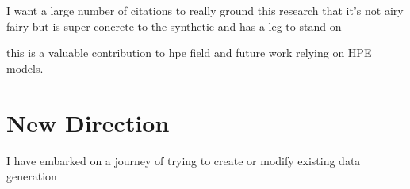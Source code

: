 I want a large number of citations to really ground this research that it's not airy fairy but is super concrete to the synthetic and has a leg to stand on

this is a valuable contribution to hpe field and future work relying on HPE models.

\section{New Direction}

I have embarked on a journey of trying to create or modify existing data generation 


\label{sec:relatedwork}
